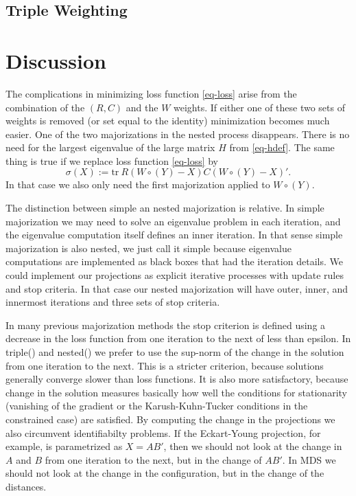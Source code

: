 \documentclass[
  12pt,
  letterpaper,
  DIV=11,
  numbers=noendperiod]{scrartcl}
\newcommand{\sectionbreak}{\clearpage}
\begin{document}
\subsection{Triple Weighting}\label{triple-weighting}

\sectionbreak

\section{Discussion}\label{discussion}

The complications in minimizing loss function \eqref{eq-loss} arise from
the combination of the \((R,C)\) and the \(W\) weights. If either one of
these two sets of weights is removed (or set equal to the identity)
minimization becomes much easier. One of the two majorizations in the
nested process disappears. There is no need for the largest eigenvalue
of the large matrix \(H\) from \eqref{eq-hdef}. The same thing is true
if we replace loss function \eqref{eq-loss} by \begin{equation}
\sigma(X):=\text{tr}\ R(W\circ(Y)-X)C(W\circ(Y)-X)'.\label{eq-lossno}
\end{equation} In that case we also only need the first majorization
applied to \(W\circ(Y)\).

The distinction between simple an nested majorization is relative. In
simple majorization we may need to solve an eigenvalue problem in each
iteration, and the eigenvalue computation itself defines an inner
iteration. In that sense simple majorization is also nested, we just
call it simple because eigenvalue computations are implemented as black
boxes that had the iteration details. We could implement our projections
as explicit iterative processes with update rules and stop criteria. In
that case our nested majorization will have outer, inner, and innermost
iterations and three sets of stop criteria.

In many previous majorization methods the stop criterion is defined
using a decrease in the loss function from one iteration to the next of
less than epsilon. In triple() and nested() we prefer to use the
sup-norm of the change in the solution from one iteration to the next.
This is a stricter criterion, because solutions generally converge
slower than loss functions. It is also more satisfactory, because change
in the solution measures basically how well the conditions for
stationarity (vanishing of the gradient or the Karush-Kuhn-Tucker
conditions in the constrained case) are satisfied. By computing the
change in the projections we also circumvent identifiabilty problems. If
the Eckart-Young projection, for example, is parametrized as \(X=AB'\),
then we should not look at the change in \(A\) and \(B\) from one
iteration to the next, but in the change of \(AB'\). In MDS we should
not look at the change in the configuration, but in the change of the
distances.
\end{document}
